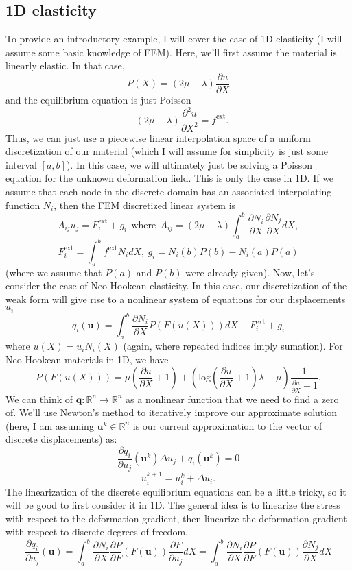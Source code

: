 \documentclass[article]{pcms-l}
\begin{document}
\subsection*{1D elasticity}
To provide an introductory example, I will cover the case of 1D elasticity (I will assume some basic knowledge of FEM). Here, we'll first assume the material is linearly elastic. In that case,
$$
P(X)=(2\mu-\lambda)\frac{\partial{u}}{\partial{X}}
$$
and the equilibrium equation is just Poisson
$$
-(2\mu-\lambda)\frac{\partial^2{u}}{\partial{X}^2}=f^\textrm{ext}.
$$
Thus, we can just use a piecewise linear interpolation space of a uniform discretization of our material (which I will assume for simplicity is just some interval $[a,b]$). In this case, we will ultimately just be solving a Poisson equation for the unknown deformation field. This is only the case in 1D. If we assume that each node in the discrete domain has an associated interpolating function $N_i$, then the FEM discretized linear system is
$$
A_{ij}u_j=F^\textrm{ext}_i+g_i \ \ \textrm{where} \ \ A_{ij}=(2\mu-\lambda)\int_a^b\frac{\partial{N_i}}{\partial{X}}\frac{\partial{N_j}}{\partial{X}}dX, 
$$
$$
F^\textrm{ext}_i=\int_a^bf^\textrm{ext}N_idX, \ g_i=N_i(b)P(b)-N_i(a)P(a)
$$
(where we assume that $P(a)$ and $P(b)$ were already given). Now, let's consider the case of Neo-Hookean elasticity. In this case, our discretization of the weak form will give rise to a nonlinear system of equations for our displacements $u_i$
$$
q_i(\mathbf{u})=\int_a^b\frac{\partial{N_i}}{\partial{X}}P(F(u(X)))dX-F^\textrm{ext}_i+g_i
$$
where $u(X)=u_iN_i(X)$ (again, where repeated indices imply sumation). For Neo-Hookean materials in 1D, we have
$$
P(F(u(X)))=\mu(\frac{\partial{u}}{\partial{X}}+1)+(\textrm{log}(\frac{\partial{u}}{\partial{X}}+1)\lambda-\mu)\frac{1}{\frac{\partial{u}}{\partial{X}}+1}.
$$
We can think of $\mathbf{q}:\mathbb{R}^n\rightarrow\mathbb{R}^n$ as a nonlinear function that we need to find a zero of. We'll use Newton's method to iteratively improve our approximate solution (here, I am assuming $\mathbf{u}^k\in\mathbb{R}^n$ is our current approximation to the vector of discrete displacements) as:
$$
\frac{\partial{q_i}}{\partial{u_j}}(\mathbf{u}^k)\Delta{u}_j+q_i(\mathbf{u}^k)=0
$$
$$
u_i^{k+1}=u_i^{k}+\Delta{u}_i.
$$
The linearization of the discrete equilibrium equations can be a little tricky, so it will be good to first consider it in 1D. The general idea is to linearize the stress with respect to the deformation gradient, then linearize the deformation gradient with respect to discrete degrees of freedom.
$$
\frac{\partial{q}_i}{\partial{u}_j}(\mathbf{u})=\int_a^b\frac{\partial{N_i}}{\partial{X}}\frac{\partial{P}}{\partial{F}}(F(\mathbf{u}))\frac{\partial{F}}{\partial{u}_j}dX=\int_a^b\frac{\partial{N_i}}{\partial{X}}\frac{\partial{P}}{\partial{F}}(F(\mathbf{u}))\frac{\partial{N_j}}{\partial{X}}dX
$$
\end{document}
